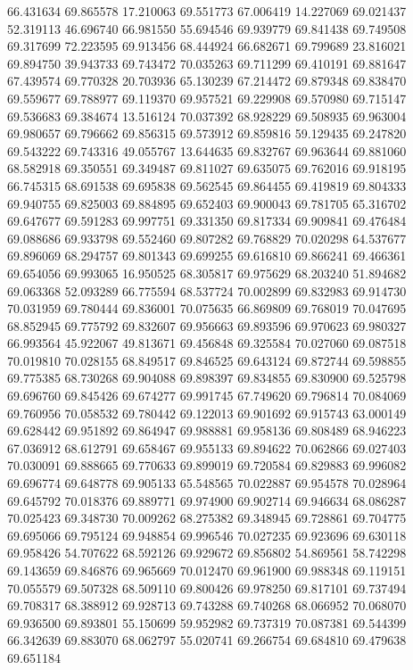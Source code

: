 66.431634
69.865578
17.210063
69.551773
67.006419
14.227069
69.021437
52.319113
46.696740
66.981550
55.694546
69.939779
69.841438
69.749508
69.317699
72.223595
69.913456
68.444924
66.682671
69.799689
23.816021
69.894750
39.943733
69.743472
70.035263
69.711299
69.410191
69.881647
67.439574
69.770328
20.703936
65.130239
67.214472
69.879348
69.838470
69.559677
69.788977
69.119370
69.957521
69.229908
69.570980
69.715147
69.536683
69.384674
13.516124
70.037392
68.928229
69.508935
69.963004
69.980657
69.796662
69.856315
69.573912
69.859816
59.129435
69.247820
69.543222
69.743316
49.055767
13.644635
69.832767
69.963644
69.881060
68.582918
69.350551
69.349487
69.811027
69.635075
69.762016
69.918195
66.745315
68.691538
69.695838
69.562545
69.864455
69.419819
69.804333
69.940755
69.825003
69.884895
69.652403
69.900043
69.781705
65.316702
69.647677
69.591283
69.997751
69.331350
69.817334
69.909841
69.476484
69.088686
69.933798
69.552460
69.807282
69.768829
70.020298
64.537677
69.896069
68.294757
69.801343
69.699255
69.616810
69.866241
69.466361
69.654056
69.993065
16.950525
68.305817
69.975629
68.203240
51.894682
69.063368
52.093289
66.775594
68.537724
70.002899
69.832983
69.914730
70.031959
69.780444
69.836001
70.075635
66.869809
69.768019
70.047695
68.852945
69.775792
69.832607
69.956663
69.893596
69.970623
69.980327
66.993564
45.922067
49.813671
69.456848
69.325584
70.027060
69.087518
70.019810
70.028155
68.849517
69.846525
69.643124
69.872744
69.598855
69.775385
68.730268
69.904088
69.898397
69.834855
69.830900
69.525798
69.696760
69.845426
69.674277
69.991745
67.749620
69.796814
70.084069
69.760956
70.058532
69.780442
69.122013
69.901692
69.915743
63.000149
69.628442
69.951892
69.864947
69.988881
69.958136
69.808489
68.946223
67.036912
68.612791
69.658467
69.955133
69.894622
70.062866
69.027403
70.030091
69.888665
69.770633
69.899019
69.720584
69.829883
69.996082
69.696774
69.648778
69.905133
65.548565
70.022887
69.954578
70.028964
69.645792
70.018376
69.889771
69.974900
69.902714
69.946634
68.086287
70.025423
69.348730
70.009262
68.275382
69.348945
69.728861
69.704775
69.695066
69.795124
69.948854
69.996546
70.027235
69.923696
69.630118
69.958426
54.707622
68.592126
69.929672
69.856802
54.869561
58.742298
69.143659
69.846876
69.965669
70.012470
69.961900
69.988348
69.119151
70.055579
69.507328
68.509110
69.800426
69.978250
69.817101
69.737494
69.708317
68.388912
69.928713
69.743288
69.740268
68.066952
70.068070
69.936500
69.893801
55.150699
59.952982
69.737319
70.087381
69.544399
66.342639
69.883070
68.062797
55.020741
69.266754
69.684810
69.479638
69.651184
